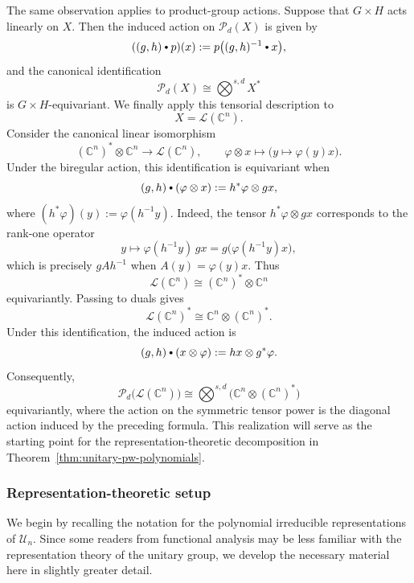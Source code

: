 \documentclass[11pt,showkeys]{amsart}
\newcommand{\hbullet}{\mathbin{\vcenter{\hbox{\scalebox{0.7}{$\bullet$}}}}}
\begin{document}
The same observation applies to product-group actions. Suppose that
\(G\times H\) acts linearly on \(X\). Then the induced action on
\(\mathcal P_d(X)\) is given by
\[
        ((g,h)\hbullet p)(x)
        :=
        p\bigl((g,h)^{-1}\hbullet x\bigr),
\]
and the canonical identification
\[
        \mathcal P_d(X)
        \cong
        \bigotimes\nolimits^{s,d}X^*
\]
is \(G\times H\)-equivariant.
We finally apply this tensorial description to
\[
    X=\mathcal L(\mathbb C^n).
\]
Consider the canonical linear isomorphism
\[
    (\mathbb C^n)^*\otimes\mathbb C^n
    \longrightarrow
    \mathcal L(\mathbb C^n),
    \qquad
    \varphi\otimes x
    \longmapsto
    \bigl(y\mapsto\varphi(y)x\bigr).
\]
Under the biregular action, this identification is equivariant when
\[
    (g,h)\hbullet(\varphi\otimes x)
    :=
    h^*\varphi\otimes gx,
\]
where
\(
    (h^*\varphi)(y):=\varphi(h^{-1}y).
\)
Indeed, the tensor \(h^*\varphi\otimes gx\) corresponds to the
rank-one operator
\[
    y\longmapsto \varphi(h^{-1}y)\,gx
    =
    g\bigl(\varphi(h^{-1}y)x\bigr),
\]
which is precisely \(gAh^{-1}\) when
\(A(y)=\varphi(y)x\). Thus
\[
    \mathcal L(\mathbb C^n)
    \cong
    (\mathbb C^n)^*\otimes\mathbb C^n
\]
equivariantly.
Passing to duals gives
\[
    \mathcal L(\mathbb C^n)^*
    \cong
    \mathbb C^n\otimes(\mathbb C^n)^*.
\]
Under this identification, the induced action is
\[
    (g,h)\hbullet(x\otimes\varphi)
    :=
    hx\otimes g^*\varphi.
\]
Consequently,
\begin{equation}
\label{symmetry}
    \mathcal P_d\bigl(\mathcal L(\mathbb C^n)\bigr)
    \cong
    \bigotimes\nolimits^{s,d}
    \bigl(\mathbb C^n\otimes(\mathbb C^n)^*\bigr)
\end{equation}
equivariantly, where the action on the symmetric tensor power is the
diagonal action induced by the preceding formula. This realization
will serve as the starting point for the representation-theoretic
decomposition in Theorem~\ref{thm:unitary-pw-polynomials}.








\subsubsection{Representation-theoretic setup}
\label{sec:unitary-polynomial-projection}
We begin by recalling the notation for the polynomial irreducible
representations of \(\mathcal U_n\). Since some readers from functional analysis may be less familiar with
the representation theory of the unitary group, we develop the
necessary material here in slightly greater detail.
\end{document}
